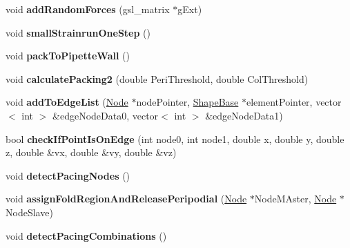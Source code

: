 \begin{DoxyCompactItemize}
\item 
\hypertarget{classSimulation_ad14662c0f9cee95a76c523130e8e688d}{}void {\bfseries add\+Random\+Forces} (gsl\+\_\+matrix $\ast$g\+Ext)\label{classSimulation_ad14662c0f9cee95a76c523130e8e688d}

\item 
\hypertarget{classSimulation_a977de0c85607b9c8e4422ca90776e72a}{}void {\bfseries small\+Strainrun\+One\+Step} ()\label{classSimulation_a977de0c85607b9c8e4422ca90776e72a}

\item 
\hypertarget{classSimulation_a5400ce12848ff3886d56437519728382}{}void {\bfseries pack\+To\+Pipette\+Wall} ()\label{classSimulation_a5400ce12848ff3886d56437519728382}

\item 
\hypertarget{classSimulation_a8ca083728aa268d8adc5a419fd0aef99}{}void {\bfseries calculate\+Packing2} (double Peri\+Threshold, double Col\+Threshold)\label{classSimulation_a8ca083728aa268d8adc5a419fd0aef99}

\item 
\hypertarget{classSimulation_ac14ee5f91a1a0763f895cdb1a6ad632e}{}void {\bfseries add\+To\+Edge\+List} (\hyperlink{classNode}{Node} $\ast$node\+Pointer, \hyperlink{classShapeBase}{Shape\+Base} $\ast$element\+Pointer, vector$<$ int $>$ \&edge\+Node\+Data0, vector$<$ int $>$ \&edge\+Node\+Data1)\label{classSimulation_ac14ee5f91a1a0763f895cdb1a6ad632e}

\item 
\hypertarget{classSimulation_aded788a841393ce3c356b0d9c5c30611}{}bool {\bfseries check\+If\+Point\+Is\+On\+Edge} (int node0, int node1, double x, double y, double z, double \&vx, double \&vy, double \&vz)\label{classSimulation_aded788a841393ce3c356b0d9c5c30611}

\item 
\hypertarget{classSimulation_ab67230d22a5c07292574d10d5ee8fc13}{}void {\bfseries detect\+Pacing\+Nodes} ()\label{classSimulation_ab67230d22a5c07292574d10d5ee8fc13}

\item 
\hypertarget{classSimulation_a5a12ff087efbc813a949e347da7a0438}{}void {\bfseries assign\+Fold\+Region\+And\+Release\+Peripodial} (\hyperlink{classNode}{Node} $\ast$Node\+M\+Aster, \hyperlink{classNode}{Node} $\ast$Node\+Slave)\label{classSimulation_a5a12ff087efbc813a949e347da7a0438}

\item 
\hypertarget{classSimulation_aa414b669f99aab94e2445d42f5822e51}{}void {\bfseries detect\+Pacing\+Combinations} ()\label{classSimulation_aa414b669f99aab94e2445d42f5822e51}


\end{DoxyCompactItemize}
